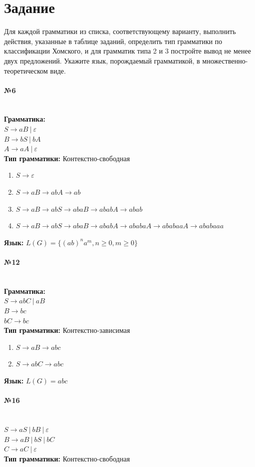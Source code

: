 \documentclass[12pt,onecolumn]{article}
\newcommand{\nparagraph}[1]{\paragraph{#1}\mbox{}\\}
\begin{document}
\section*{Задание}
Для каждой грамматики из списка, соответствующему варианту, выполнить действия,
указанные в таблице заданий, определить тип грамматики по классификации Хомского, и
для грамматик типа 2 и 3 постройте вывод не менее двух предложений.
Укажите язык, порождаемый грамматикой, в множественно-теоретическом виде.
\nparagraph{№6}
\textbf{Грамматика:}\\
$S \to aB ~|~ \varepsilon$\\
$B \to bS ~|~ bA$\\
$A \to aA ~|~ \varepsilon$\\
\textbf{Тип грамматики: } Контекстно-свободная
\begin{enumerate}
    \item $S \to \varepsilon$
    \item $S \to aB \to abA \to ab$
    \item $S \to aB \to abS \to abaB \to ababA \to abab$
    \item $S \to aB \to abS \to abaB \to ababA \to ababaA \to ababaaA \to ababaaa$
\end{enumerate}
\textbf{Язык:} $L(G) = \{\left(ab\right)^n a^m, n \geq 0, m \geq 0\}$
\nparagraph{№12}
\textbf{Грамматика:}\\
$S \to abC~ |~ aB$ \\
$B \to bc$\\
$bC \to bc$\\
\textbf{Тип грамматики: } Контекстно-зависимая
\begin{enumerate}
    \item $S \to aB \to abc$
    \item $S \to abC \to abc$
\end{enumerate}
\textbf{Язык:} $L(G) = {abc}$
\nparagraph{№16}
$S \to aS~ |~ bB~ |~ \varepsilon$\\
$B \to aB~ |~ bS~ |~ bC$\\
$C \to aC~ |~ \varepsilon$\\
\textbf{Тип грамматики: } Контекстно-свободная
\end{document}
